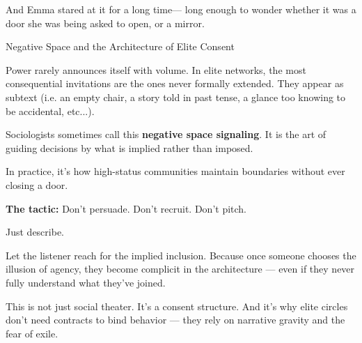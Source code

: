 And Emma stared at it for a long time—
long enough to wonder whether it was a door she was being asked to open,
or a mirror.

\medskip

\begin{PsychologicalSidebar}{Negative Space and the Architecture of Elite Consent}

Power rarely announces itself with volume.  
In elite networks, the most consequential invitations are the ones never formally extended.  
They appear as subtext (i.e. an empty chair, a story told in past tense, a glance too knowing 
to be accidental, etc...).

\medskip

Sociologists sometimes call this \textbf{negative space signaling}. It is the art of guiding 
decisions by what is implied rather than imposed.  

\medskip

In practice, it's how high-status communities maintain boundaries without ever closing a door.  

\medskip

\textbf{The tactic:}  Don’t persuade. Don’t recruit. Don’t pitch.

\medskip

Just describe.

\medskip

Let the listener reach for the implied inclusion.  
Because once someone chooses the illusion of agency, they become complicit in the architecture — even if 
they never fully understand what they’ve joined.

\medskip

This is not just social theater.  
It’s a consent structure.  
And it’s why elite circles don’t need contracts to bind behavior — they rely on narrative gravity and the fear of exile.

\end{PsychologicalSidebar}

\medskip


